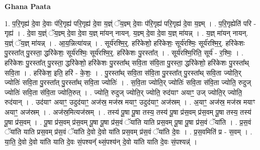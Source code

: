 \documentclass[17pt]{extarticle}
\begin{document}
\textbf{Ghana Paata } \newline

1. प॒रि॒गृह्य॑ दे॒वा दे॒वाः प॑रि॒गृह्य॑ परि॒गृह्य॑ दे॒वा य॒ज्ञ्ं ॅय॒ज्ञ्म् दे॒वाः प॑रि॒गृह्य॑ परि॒गृह्य॑ दे॒वा य॒ज्ञ्म् । . प॒रि॒गृह्येति॑ परि - गृह्य॑ । . दे॒वा य॒ज्ञ्ं ॅय॒ज्ञ्म् दे॒वा दे॒वा य॒ज्ञ् मा॑यन् नायन्. य॒ज्ञ्म् दे॒वा दे॒वा य॒ज्ञ् मा॑यन्न् । . य॒ज्ञ् मा॑यन् नायन्. य॒ज्ञ्ं ॅय॒ज्ञ् मा॑यन्न् । . आ॒य॒न्नित्या॑यन्न् । . सूर्य॑रश्मि॒र्॒. हरि॑केशो॒ हरि॑केशः॒ सूर्य॑रश्मिः॒ सूर्य॑रश्मि॒र्॒. हरि॑केशः पु॒रस्ता᳚त् पु॒रस्ता॒ द्धरि॑केशः॒ सूर्य॑रश्मिः॒ सूर्य॑रश्मि॒र्॒. हरि॑केशः पु॒रस्ता᳚त् । . सूर्य॑रश्मि॒रिति॒ सूर्य॑ - र॒श्मिः॒ । . हरि॑केशः पु॒रस्ता᳚त् पु॒रस्ता॒ द्धरि॑केशो॒ हरि॑केशः पु॒रस्ता᳚थ् सवि॒ता स॑वि॒ता पु॒रस्ता॒ द्धरि॑केशो॒ हरि॑केशः पु॒रस्ता᳚थ् सवि॒ता । . हरि॑केश॒ इति॒ हरि॑ - के॒शः॒ । . पु॒रस्ता᳚थ् सवि॒ता स॑वि॒ता पु॒रस्ता᳚त् पु॒रस्ता᳚थ् सवि॒ता ज्योति॒र् ज्योतिः॑ सवि॒ता पु॒रस्ता᳚त् पु॒रस्ता᳚थ् सवि॒ता ज्योतिः॑ । . स॒वि॒ता ज्योति॒र् ज्योतिः॑ सवि॒ता स॑वि॒ता ज्योति॒ रुदुज् ज्योतिः॑ सवि॒ता स॑वि॒ता ज्योति॒रुत् । . ज्योति॒ रुदुज् ज्योति॒र् ज्योति॒ रुद॑याꣳ अयाꣳ॒॒ उज् ज्योति॒र् ज्योति॒ रुद॑यान् । . उद॑याꣳ अयाꣳ॒॒ उदुद॑याꣳ॒॒ अज॑स्र॒ मज॑स्र मयाꣳ॒॒ उदुद॑याꣳ॒॒ अज॑स्रम् । . अ॒याꣳ॒॒ अज॑स्र॒ मज॑स्र मयाꣳ अयाꣳ॒॒ अज॑स्रम् । . अज॑स्र॒मित्यज॑स्रम् । . तस्य॑ पू॒षा पू॒षा तस्य॒ तस्य॑ पू॒षा प्र॑स॒वम् प्र॑स॒वम् पू॒षा तस्य॒ तस्य॑ पू॒षा प्र॑स॒वम् । . पू॒षा प्र॑स॒वम् प्र॑स॒वम् पू॒षा पू॒षा प्र॑स॒वं ॅया॑ति याति प्रस॒वम् पू॒षा पू॒षा प्र॑स॒वं ॅया॑ति । . प्र॒स॒वं ॅया॑ति याति प्रस॒वम् प्र॑स॒वं ॅया॑ति दे॒वो दे॒वो या॑ति प्रस॒वम् प्र॑स॒वं ॅया॑ति दे॒वः । . प्र॒स॒वमिति॑ प्र - स॒वम् । . या॒ति॒ दे॒वो दे॒वो या॑ति याति दे॒वः सं॒पश्यन्᳚ थ्सं॒पश्य॑न् दे॒वो या॑ति याति दे॒वः सं॒पश्यन्न्॑ । \newline
\end{document}
